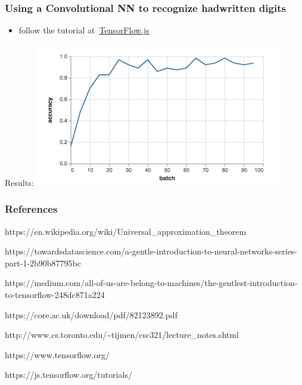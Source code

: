 \documentclass[xcolor=table]{beamer}
\begin{document}
\begin{mdframe}%

\frametitle{Using a Convolutional NN to recognize hadwritten digits}\label{heading-sec-using-a-convolutional-nn-to-recognize-hadwritten-digits}%

\begin{itemize}[noitemsep,topsep=\mdcompacttopsep]%

\item{}follow the tutorial at~\href{https://js.tensorflow.org/tutorials/mnist.html}{TensorFlow.js}%
\end{itemize}%

\noindent{}Results:
\includegraphics[keepaspectratio=true,width=\dimmin{}{\dimwidth{0.90}}]{images/tfjs}{}%
\end{mdframe}\label{sec-using-a-convolutional-nn-to-recognize-hadwritten-digits}%

\begin{mdframe}%

\frametitle*{References}\label{heading-sec-references}%

\noindent{}https://en.wikipedia.org/wiki/Universal\_approximation\_theorem%

https://towardsdatascience.com/a-gentle-introduction-to-neural-networks-series-part-1-2b90b87795bc%

https://medium.com/all-of-us-are-belong-to-machines/the-gentlest-introduction-to-tensorflow-248dc871a224%

https://core.ac.uk/download/pdf/82123892.pdf%

http://www.cs.toronto.edu/\textasciitilde{}tijmen/csc321/lecture\_notes.shtml%

https://www.tensorflow.org/%

https://js.tensorflow.org/tutorials/%
\end{mdframe}\label{sec-references}%
\end{document}
